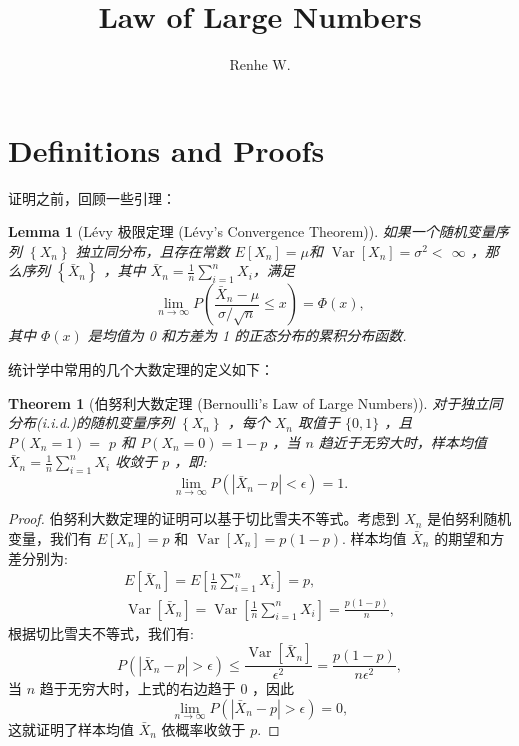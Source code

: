 \documentclass[UTF8,12pt]{ctexart}
\title{Law of Large Numbers}
\author{Renhe W.}
\date{ }
\numberwithin{equation}{section}%
\newtheorem{thm}{Theorem}[section]
\newtheorem{lemma}{Lemma}[section]
\begin{document}
	\maketitle
	\section{Definitions and Proofs}
	证明之前，回顾一些引理：
	\begin{lemma}[Lévy 极限定理 (Lévy's Convergence Theorem)]
		如果一个随机变量序列 $\left\{X_n\right\}$ 独立同分布，且存在常数 $E\left[X_n\right]=\mu$和 $\operatorname{Var}\left[X_n\right]=\sigma^2<$ $\infty$ ，那么序列 $\left\{\bar{X}_n\right\}$ ，其中 $\bar{X}_n=\frac{1}{n} \sum_{i=1}^n X_i$，满足
		$$
		\lim _{n \rightarrow \infty} P\left(\frac{\bar{X}_n-\mu}{\sigma / \sqrt{n}} \leq x\right)=\Phi(x),
		$$
		其中 $\Phi(x)$ 是均值为 0 和方差为 1 的正态分布的累积分布函数.
	\end{lemma}
	
	
	
	统计学中常用的几个大数定理的定义如下：
	
	\begin{thm}[伯努利大数定理 (Bernoulli's Law of Large Numbers)]
		对于独立同分布(i.i.d.)的随机变量序列 $\left\{X_n\right\}$ ，每个 $X_n$ 取值于 $\{0,1\}$ ，且 $P\left(X_n=1\right)=$ $p$ 和 $P\left(X_n=0\right)=1-p$ ，当 $n$ 趋近于无穷大时，样本均值 $\bar{X}_n=\frac{1}{n} \sum_{i=1}^n X_i$ 收敛于 $p$ ，即:
		$$
		\lim _{n \rightarrow \infty} P\left( |\bar{X}_n-p|<\epsilon\right)=1.
		$$
	\end{thm}
	\begin{proof}
		伯努利大数定理的证明可以基于切比雪夫不等式。考虑到 $X_n$ 是伯努利随机变量，我们有 $E\left[X_n\right]=p$ 和 $\operatorname{Var}\left[X_n\right]=p(1-p)$. 样本均值 $\bar{X}_n$ 的期望和方差分别为:
		$$
		\begin{gathered}
			E\left[\bar{X}_n\right]=E\left[\frac{1}{n} \sum_{i=1}^n X_i\right]=p, \\
			\operatorname{Var}\left[\bar{X}_n\right]=\operatorname{Var}\left[\frac{1}{n} \sum_{i=1}^n X_i\right]=\frac{p(1-p)}{n},
		\end{gathered}
		$$
		根据切比雪夫不等式，我们有:
		$$
		P\left(\left|\bar{X}_n-p\right|>\epsilon\right) \leq \frac{\operatorname{Var}\left[\bar{X}_n\right]}{\epsilon^2}=\frac{p(1-p)}{n \epsilon^2},
		$$
		当 $n$ 趋于无穷大时，上式的右边趋于 0 ，因此
		$$
		\lim _{n \rightarrow \infty} P\left(\left|\bar{X}_n-p\right|>\epsilon\right)=0,
		$$
		这就证明了样本均值 $\bar{X}_n$ 依概率收敛于 $p$.
	\end{proof}
 
\end{document}
